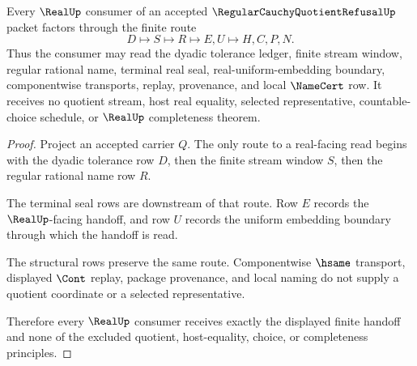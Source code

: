 \begin{theorem}
\label{thm:regular-cauchy-quotient-refusal-real-seal-handoff}
Every $\RealUp$ consumer of an accepted $\RegularCauchyQuotientRefusalUp$ packet factors through the finite route
$$
D \longmapsto S \longmapsto R \longmapsto E,U \longmapsto H,C,P,N .
$$
Thus the consumer may read the dyadic tolerance ledger, finite stream window, regular rational name, terminal real seal, real-uniform-embedding boundary, componentwise transports, replay, provenance, and local $\NameCert$ row. It receives no quotient stream, host real equality, selected representative, countable-choice schedule, or $\RealUp$ completeness theorem.
\end{theorem}
\begin{proof}
Project an accepted carrier $Q$. The only route to a real-facing read begins with the dyadic tolerance row $D$, then the finite stream window $S$, then the regular rational name row $R$.

The terminal seal rows are downstream of that route. Row $E$ records the $\RealUp$-facing handoff, and row $U$ records the uniform embedding boundary through which the handoff is read.

The structural rows preserve the same route. Componentwise $\hsame$ transport, displayed $\Cont$ replay, package provenance, and local naming do not supply a quotient coordinate or a selected representative.

Therefore every $\RealUp$ consumer receives exactly the displayed finite handoff and none of the excluded quotient, host-equality, choice, or completeness principles.
\end{proof}


\begin{closurestatus}{\RegularCauchyQuotientRefusalUp}
  \theoryclosure{\seedClosure}
  \formalstatus{\unformalizedV}
\end{closurestatus}
